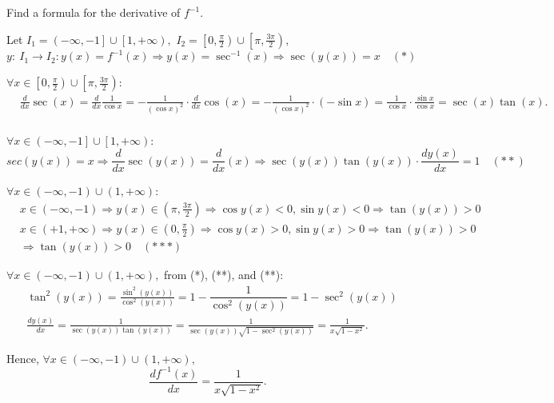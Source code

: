 \documentclass{article}
\begin{document}
\newpage

\begin{problem*}[1e]
    Find a formula for the derivative of $f^{-1}.$
\end{problem*}

\begin{soln}
    Let $I_1 = \left( -\infty, -1 \right] \cup \left[ 1, +\infty \right),$ $I_2 = \left[ 0, \frac{\pi}{2} \right) \cup \left[ \pi, \frac{3\pi}{2} \right),$
    \[
        y:\ I_1 \rightarrow I_2: y(x) = f^{-1}(x) \Rightarrow y(x) = \sec^{-1}(x) \Rightarrow \sec(y(x)) = x \quad (*)
    \]

    $\forall x \in \left[ 0, \frac{\pi}{2} \right) \cup \left[ \pi, \frac{3\pi}{2} \right):$
    \[
        \begin{aligned}
            &\frac{d}{dx} \sec(x) = \frac{d}{dx} \frac{1}{\cos{x}} = - \frac{1}{(\cos{x})^2} \cdot \frac{d}{dx} \cos(x)
            = - \frac{1}{(\cos{x})^2} \cdot (- \sin{x}) =  \frac{1}{\cos{x}} \cdot \frac{\sin{x}}{\cos{x}} = \sec(x) \tan(x).\\
        \end{aligned}
    \]

    $\forall x \in \left( -\infty, -1 \right] \cup \left[ 1, +\infty \right):$
    \[
        sec(y(x)) = x \Rightarrow \frac{d}{dx} \sec(y(x)) = \frac{d}{dx} (x) 
        \Rightarrow \sec(y(x)) \tan(y(x)) \cdot \frac{dy(x)}{dx} = 1 \quad (**)
    \]

    $\forall x \in \left( -\infty, -1 \right) \cup \left( 1, +\infty \right):$
    \[
        \begin{aligned}
            &x \in \left( -\infty, -1 \right) \Rightarrow y(x) \in \left( \pi, \frac{3\pi}{2} \right) \Rightarrow \cos{y(x)} < 0, \sin{y(x)} < 0 \Rightarrow \tan(y(x)) > 0\\
            &x \in \left( +1, +\infty \right) \Rightarrow y(x) \in \left( 0, \frac{\pi}{2} \right) \Rightarrow \cos{y(x)} > 0, \sin{y(x)} > 0 \Rightarrow \tan(y(x)) > 0\\
            &\Rightarrow \tan(y(x)) > 0 \quad (***)
        \end{aligned}        
    \]

    $\forall x \in \left( -\infty, -1 \right) \cup \left( 1, +\infty \right),$ from (*), (**), and (**):
    \[
        \begin{aligned}
            &\tan^2(y(x)) = \frac{\sin^2(y(x))}{\cos^2(y(x))} = 1- \dfrac{1}{\cos^2(y(x))} = 1 - \sec^2(y(x))\\
            &\frac{d y(x)}{dx} = \frac{1}{\sec(y(x)) \tan(y(x))} = \frac{1}{\sec(y(x)) \sqrt{1-\sec^2(y(x))}} = \frac{1}{x \sqrt{1-x^2}}.
        \end{aligned}
    \]

    Hence, $\forall x \in \left( -\infty, -1 \right) \cup \left( 1, +\infty \right),$ 
    \[
        \frac{d f^{-1}(x)}{dx} = \frac{1}{x \sqrt{1-x^2}}.
    \]
\end{soln}
\end{document}
